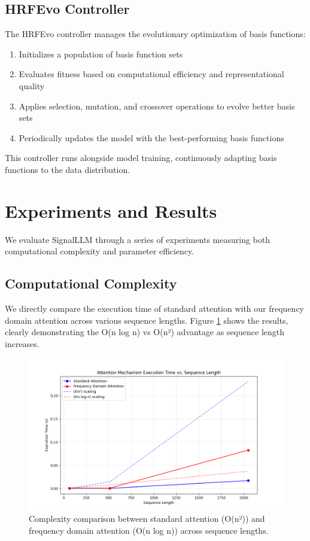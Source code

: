 \documentclass[10pt,twocolumn,letterpaper]{article}
\begin{document}
\subsection{HRFEvo Controller}

The HRFEvo controller manages the evolutionary optimization of basis functions:

\begin{enumerate}
    \item Initializes a population of basis function sets
    \item Evaluates fitness based on computational efficiency and representational quality
    \item Applies selection, mutation, and crossover operations to evolve better basis sets
    \item Periodically updates the model with the best-performing basis functions
\end{enumerate}

This controller runs alongside model training, continuously adapting basis functions to the data distribution.

\section{Experiments and Results}

We evaluate SignalLLM through a series of experiments measuring both computational complexity and parameter efficiency.

\subsection{Computational Complexity}

We directly compare the execution time of standard attention with our frequency domain attention across various sequence lengths. Figure \ref{fig:complexity} shows the results, clearly demonstrating the O(n log n) vs O(n²) advantage as sequence length increases.

\begin{figure}[t]
    \centering
    \includegraphics[width=0.9\linewidth]{report_assets/complexity_comparison.png}
    \caption{Complexity comparison between standard attention (O(n²)) and frequency domain attention (O(n log n)) across sequence lengths.}
    \label{fig:complexity}
\end{figure}
\end{document}

